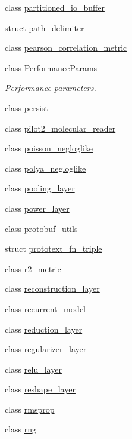 \begin{DoxyCompactItemize}
class \hyperlink{classlbann_1_1partitioned__io__buffer}{partitioned\+\_\+io\+\_\+buffer}
\item 
struct \hyperlink{structlbann_1_1path__delimiter}{path\+\_\+delimiter}
\item 
class \hyperlink{classlbann_1_1pearson__correlation__metric}{pearson\+\_\+correlation\+\_\+metric}
\item 
class \hyperlink{classlbann_1_1PerformanceParams}{Performance\+Params}
\begin{DoxyCompactList}\small\item\em Performance parameters. \end{DoxyCompactList}\item 
class \hyperlink{classlbann_1_1persist}{persist}
\item 
class \hyperlink{classlbann_1_1pilot2__molecular__reader}{pilot2\+\_\+molecular\+\_\+reader}
\item 
class \hyperlink{classlbann_1_1poisson__negloglike}{poisson\+\_\+negloglike}
\item 
class \hyperlink{classlbann_1_1polya__negloglike}{polya\+\_\+negloglike}
\item 
class \hyperlink{classlbann_1_1pooling__layer}{pooling\+\_\+layer}
\item 
class \hyperlink{classlbann_1_1power__layer}{power\+\_\+layer}
\item 
class \hyperlink{classlbann_1_1protobuf__utils}{protobuf\+\_\+utils}
\item 
struct \hyperlink{structlbann_1_1prototext__fn__triple}{prototext\+\_\+fn\+\_\+triple}
\item 
class \hyperlink{classlbann_1_1r2__metric}{r2\+\_\+metric}
\item 
class \hyperlink{classlbann_1_1reconstruction__layer}{reconstruction\+\_\+layer}
\item 
class \hyperlink{classlbann_1_1recurrent__model}{recurrent\+\_\+model}
\item 
class \hyperlink{classlbann_1_1reduction__layer}{reduction\+\_\+layer}
\item 
class \hyperlink{classlbann_1_1regularizer__layer}{regularizer\+\_\+layer}
\item 
class \hyperlink{classlbann_1_1relu__layer}{relu\+\_\+layer}
\item 
class \hyperlink{classlbann_1_1reshape__layer}{reshape\+\_\+layer}
\item 
class \hyperlink{classlbann_1_1rmsprop}{rmsprop}
\item 
class \hyperlink{classlbann_1_1rng}{rng}

\end{DoxyCompactItemize}
